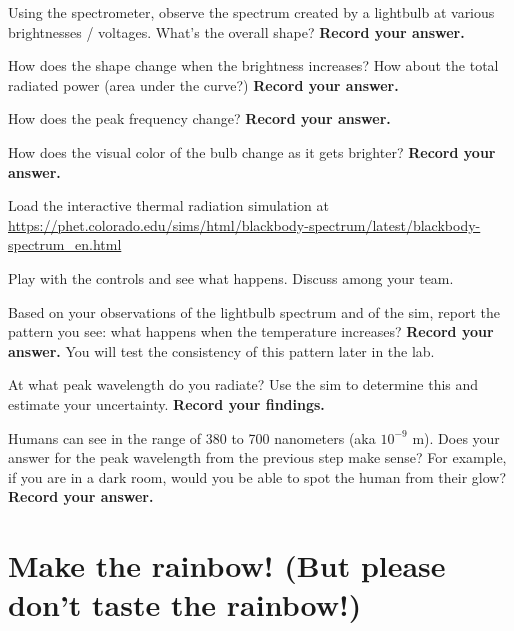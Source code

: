 \begin{steps}
	
	\item\label{ic:it:spec1} Using the spectrometer, observe the spectrum created by a lightbulb at various brightnesses / voltages.  What's the overall shape? \textbf{Record your answer.}
	
	\item How does the shape change when the brightness increases? How about the total radiated power (area under the curve?) \textbf{Record your answer.}
	
	\item How does the peak frequency change? \textbf{Record your answer.}
	
	\item\label{ic:it:spec2} How does the visual color of the bulb change as it gets brighter? \textbf{Record your answer.}

	\item\label{ic:step:load-sim} Load the interactive thermal radiation simulation
	at
	\url{https://phet.colorado.edu/sims/html/blackbody-spectrum/latest/blackbody-spectrum_en.html}
	
	\item Play with the controls and see what happens. Discuss among your team.
	
	\item\label{ic:step:pattern} Based on your observations of the lightbulb spectrum and of the sim, report the pattern you see: what happens when the temperature increases? \textbf{Record your answer.} You will test the consistency of this pattern later in the lab.
	
	\item\label{ic:it:human1} At what peak wavelength do you radiate? Use the sim to determine this and 
	estimate your uncertainty. \textbf{Record your findings.}
	
	\item\label{ic:it:human2} Humans can see in the range of 380 to 700 nanometers (aka $10^{-9}$ m). Does your answer for the peak wavelength from the previous step make sense? For example, if you are in a dark room, would you be able to spot the human from their glow? \textbf{Record your answer.}

\end{steps}

\section{Make the rainbow! (But please don't taste the rainbow!)}

